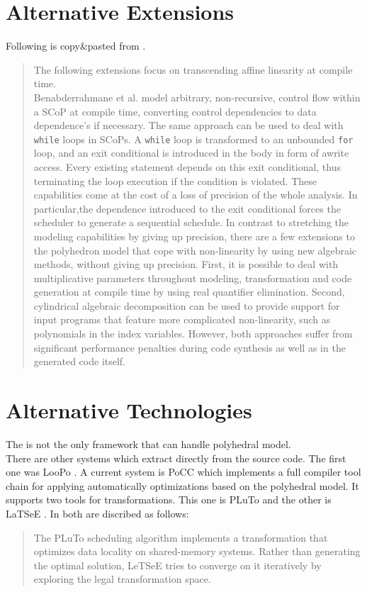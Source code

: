 \section[Alternative Extensions]{Alternative Extensions \cite{PolyhedralEmpiricalStudy}}\label{sec:altExt}
Following is copy\&pasted from \cite{PolyhedralEmpiricalStudy}.
\begin{quotation}
The following extensions focus on transcending affine linearity at compile time.\\
Benabderrahmane et al. model arbitrary, non-recursive, control flow within a SCoP at compile time, converting control dependencies to data dependence's if necessary.
The same approach can be used to deal with \texttt{while} loops in SCoPs.
A \texttt{while} loop is transformed to an unbounded \texttt{for} loop, and an exit conditional is introduced in the body in form of awrite access.
Every existing statement depends on this exit conditional, thus terminating the loop execution if the condition is violated.
These capabilities come at the cost of a loss of precision of the whole analysis.
In particular,the dependence introduced to the exit conditional forces the scheduler to generate a sequential schedule.
In contrast to stretching the modeling capabilities by giving up precision, there are a few extensions to the polyhedron model that cope with non-linearity by using new algebraic methods, without giving up precision.
First, it is possible to deal with multiplicative parameters throughout modeling, transformation and code generation at compile time by using real quantifier elimination.
Second, cylindrical algebraic decomposition can be used to provide support for input programs that feature more complicated non-linearity, such as polynomials in the index variables.
However, both approaches suffer from significant performance penalties during code synthesis as well as in the generated code itself.
\end{quotation}

\section[Alternative Technologies]{Alternative Technologies \cite{PolyhedralEmpiricalStudy}}
The \llvm is not the only framework that can handle polyhedral model.\\
There are other systems which extract \scops directly from the source code.
The first one was LooPo \cite{loopo}.
A current system is PoCC \cite{pocc} which implements a full compiler tool chain for applying automatically optimizations based on the polyhedral model.
It supports two tools for transformations.
This one is PLuTo \cite{pluto} and the other is LaTSeE \cite{latsee}.
In \cite{PolyhedralEmpiricalStudy} both are discribed as follows:
\begin{quotation}
    The PLuTo scheduling algorithm implements a transformation that optimizes data locality on shared-memory systems.
    Rather than generating the optimal solution, LeTSeE tries to converge on it iteratively by exploring the legal transformation space.
\end{quotation}
